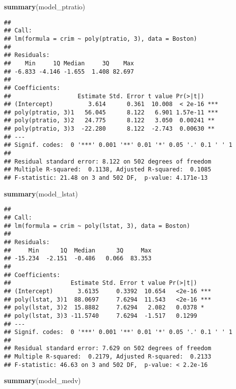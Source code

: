 \documentclass[
]{article}
\newenvironment{Shaded}{\begin{snugshade}}{\end{snugshade}}
\newcommand{\FunctionTok}[1]{\textcolor[rgb]{0.13,0.29,0.53}{\textbf{#1}}}
\newcommand{\NormalTok}[1]{#1}
\begin{document}
\begin{Shaded}
\begin{Highlighting}[]
\FunctionTok{summary}\NormalTok{(model\_ptratio)}
\end{Highlighting}
\end{Shaded}

\begin{verbatim}
## 
## Call:
## lm(formula = crim ~ poly(ptratio, 3), data = Boston)
## 
## Residuals:
##    Min     1Q Median     3Q    Max 
## -6.833 -4.146 -1.655  1.408 82.697 
## 
## Coefficients:
##                   Estimate Std. Error t value Pr(>|t|)    
## (Intercept)          3.614      0.361  10.008  < 2e-16 ***
## poly(ptratio, 3)1   56.045      8.122   6.901 1.57e-11 ***
## poly(ptratio, 3)2   24.775      8.122   3.050  0.00241 ** 
## poly(ptratio, 3)3  -22.280      8.122  -2.743  0.00630 ** 
## ---
## Signif. codes:  0 '***' 0.001 '**' 0.01 '*' 0.05 '.' 0.1 ' ' 1
## 
## Residual standard error: 8.122 on 502 degrees of freedom
## Multiple R-squared:  0.1138, Adjusted R-squared:  0.1085 
## F-statistic: 21.48 on 3 and 502 DF,  p-value: 4.171e-13
\end{verbatim}

\begin{Shaded}
\begin{Highlighting}[]
\FunctionTok{summary}\NormalTok{(model\_lstat)}
\end{Highlighting}
\end{Shaded}

\begin{verbatim}
## 
## Call:
## lm(formula = crim ~ poly(lstat, 3), data = Boston)
## 
## Residuals:
##     Min      1Q  Median      3Q     Max 
## -15.234  -2.151  -0.486   0.066  83.353 
## 
## Coefficients:
##                 Estimate Std. Error t value Pr(>|t|)    
## (Intercept)       3.6135     0.3392  10.654   <2e-16 ***
## poly(lstat, 3)1  88.0697     7.6294  11.543   <2e-16 ***
## poly(lstat, 3)2  15.8882     7.6294   2.082   0.0378 *  
## poly(lstat, 3)3 -11.5740     7.6294  -1.517   0.1299    
## ---
## Signif. codes:  0 '***' 0.001 '**' 0.01 '*' 0.05 '.' 0.1 ' ' 1
## 
## Residual standard error: 7.629 on 502 degrees of freedom
## Multiple R-squared:  0.2179, Adjusted R-squared:  0.2133 
## F-statistic: 46.63 on 3 and 502 DF,  p-value: < 2.2e-16
\end{verbatim}

\begin{Shaded}
\begin{Highlighting}[]
\FunctionTok{summary}\NormalTok{(model\_medv)}
\end{Highlighting}
\end{Shaded}
\end{document}
